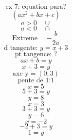\documentclass{article}
\begin{document}
\[
\text{ex 7: equation para?}
\]
\[
(ax^2 + bx + c)
\]
\[
a > 0 \quad \cup
\]
\[
a < 0 \quad \cap
\]
\[
\text{Extreme} = -\frac{b}{2a}
\]
\[
\text{d tangente: } y = x+3
\]
\[
\text{pt tangence: ?}
\]
\[
ax+b = y
\]
\[
x+3 = y
\]
\[
\text{axe y} = (0;3)
\]
\[
\text{pente de 1:1}
\]
\[
x=5
\]
\[
5+3=y
\]
\[
y=8
\]
\[
x=3
\]
\[
3+3=y
\]
\[
y=6
\]
\[
x=-2
\]
\[
-2+3=y
\]
\[
1=y
\]
\end{document}
